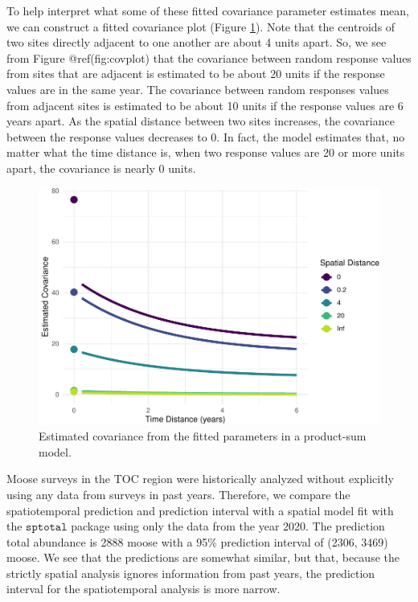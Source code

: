 \documentclass[]{interact}
\theoremstyle{plain}%
\theoremstyle{definition}
\theoremstyle{remark}
\begin{document}
To help interpret what some of these fitted covariance parameter
estimates mean, we can construct a fitted covariance plot (Figure
\ref{fig:covplot}). Note that the centroids of two sites directly
adjacent to one another are about 4 units apart. So, we see from Figure
@ref(fig:covplot) that the covariance between random response values
from sites that are adjacent is estimated to be about 20 units if the
response values are in the same year. The covariance between random
responses values from adjacent sites is estimated to be about 10 units
if the response values are 6 years apart. As the spatial distance
between two sites increases, the covariance between the response values
decreases to 0. In fact, the model estimates that, no matter what the
time distance is, when two response values are 20 or more units apart,
the covariance is nearly 0 units.

\begin{figure}
\centering
\includegraphics{fpspatiotemp_manu_files/figure-latex/covplot-1.pdf}
\caption{\label{fig:covplot} Estimated covariance from the fitted
parameters in a product-sum model.}
\end{figure}

Moose surveys in the TOC region were historically analyzed without
explicitly using any data from surveys in past years. Therefore, we
compare the spatiotemporal prediction and prediction interval with a
spatial model fit with the \(\texttt{sptotal}\) package using only the
data from the year 2020. The prediction total abundance is 2888 moose
with a 95\% prediction interval of (2306, 3469) moose. We see that the
predictions are somewhat similar, but that, because the strictly spatial
analysis ignores information from past years, the prediction interval
for the spatiotemporal analysis is more narrow.
\end{document}
